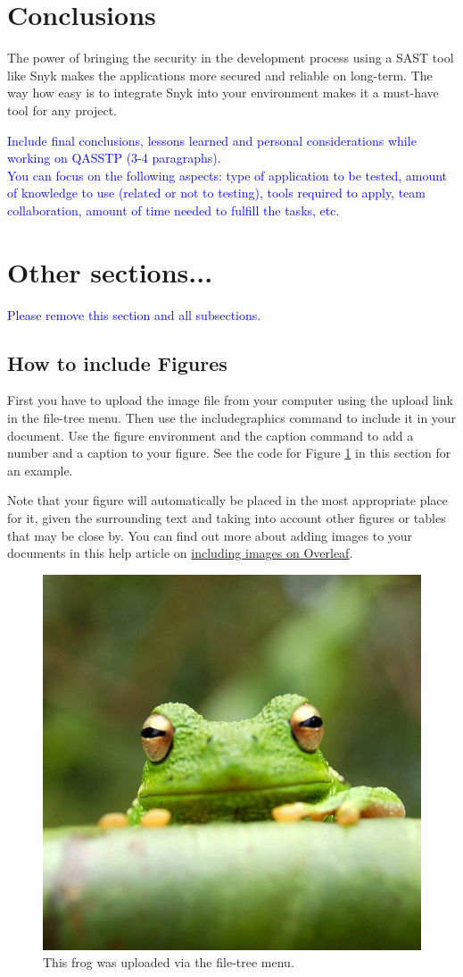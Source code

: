 \documentclass{article}
\begin{document}
\section{Conclusions}
\label{}
\par The power of bringing the security in the development process using a SAST tool like Snyk makes the applications more secured and reliable on long-term. The way how easy is to integrate Snyk into your environment makes it a must-have tool for any project.

\textcolor{blue}{Include final conclusions, lessons learned and personal considerations while working on QASSTP (3-4 paragraphs).\\
    You can focus on the following aspects: type of application to be tested, amount of knowledge to use (related or not to testing), tools required to apply, team collaboration, amount of time needed to fulfill the tasks, etc.}

\section{Other sections...}

\textcolor{blue}{Please remove this section and all subsections.}
\subsection{How to include Figures}

First you have to upload the image file from your computer using the upload link in the file-tree menu. Then use the includegraphics command to include it in your document. Use the figure environment and the caption command to add a number and a caption to your figure. See the code for Figure \ref{fig:frog} in this section for an example.

Note that your figure will automatically be placed in the most appropriate place for it, given the surrounding text and taking into account other figures or tables that may be close by. You can find out more about adding images to your documents in this help article on \href{https://www.overleaf.com/learn/how-to/Including_images_on_Overleaf}{including images on Overleaf}.

\begin{figure}
    \centering
    \includegraphics[width=0.25\linewidth]{Figures/frog.jpg}
    \caption{\label{fig:frog}This frog was uploaded via the file-tree menu.}
\end{figure}
\end{document}
